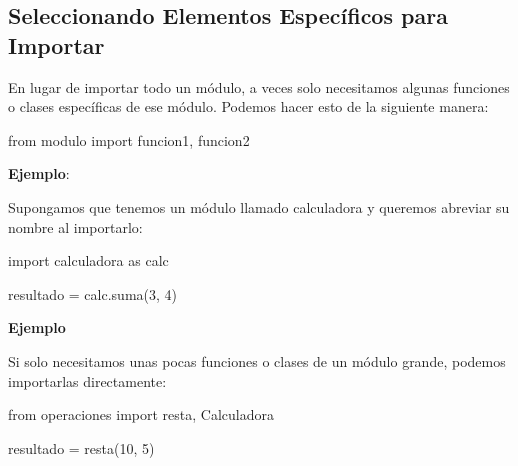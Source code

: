 \documentclass[
  a4paper,
  DIV=11,
  numbers=noendperiod,
  onepage,
  openany]{scrreprt}
\newenvironment{Shaded}{\begin{snugshade}}{\end{snugshade}}
\newcommand{\DecValTok}[1]{\textcolor[rgb]{0.68,0.00,0.00}{#1}}
\newcommand{\ImportTok}[1]{\textcolor[rgb]{0.00,0.46,0.62}{#1}}
\newcommand{\NormalTok}[1]{\textcolor[rgb]{0.00,0.23,0.31}{#1}}
\newcommand{\OperatorTok}[1]{\textcolor[rgb]{0.37,0.37,0.37}{#1}}
\begin{document}
\subsection{Seleccionando Elementos Específicos para
Importar}\label{seleccionando-elementos-especuxedficos-para-importar}

En lugar de importar todo un módulo, a veces solo necesitamos algunas
funciones o clases específicas de ese módulo. Podemos hacer esto de la
siguiente manera:

\begin{Shaded}
\begin{Highlighting}[]
\ImportTok{from}\NormalTok{ modulo }\ImportTok{import}\NormalTok{ funcion1, funcion2}
\end{Highlighting}
\end{Shaded}

\textbf{Ejemplo}:

Supongamos que tenemos un módulo llamado calculadora y queremos abreviar
su nombre al importarlo:

\begin{Shaded}
\begin{Highlighting}[]
\ImportTok{import}\NormalTok{ calculadora }\ImportTok{as}\NormalTok{ calc}

\NormalTok{resultado }\OperatorTok{=}\NormalTok{ calc.suma(}\DecValTok{3}\NormalTok{, }\DecValTok{4}\NormalTok{)}
\end{Highlighting}
\end{Shaded}

\textbf{Ejemplo}

Si solo necesitamos unas pocas funciones o clases de un módulo grande,
podemos importarlas directamente:

\begin{Shaded}
\begin{Highlighting}[]
\ImportTok{from}\NormalTok{ operaciones }\ImportTok{import}\NormalTok{ resta, Calculadora}

\NormalTok{resultado }\OperatorTok{=}\NormalTok{ resta(}\DecValTok{10}\NormalTok{, }\DecValTok{5}\NormalTok{)}
\end{Highlighting}
\end{Shaded}
\end{document}
